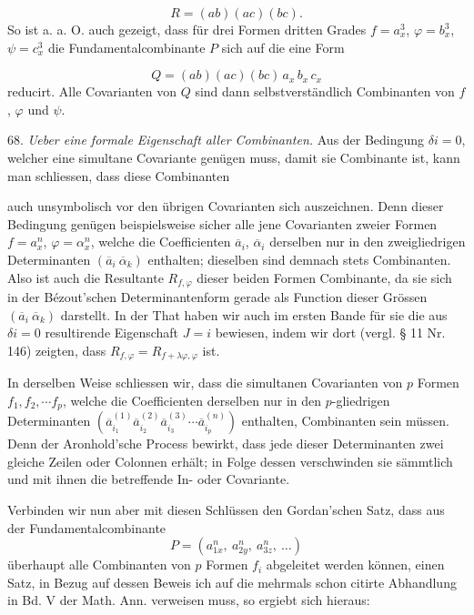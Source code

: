 \[
R = (ab)(ac)(bc) .
\]
So ist a. a. O. auch gezeigt, dass für drei Formen dritten Grades $f = a_x^3$, $\varphi = b_x^3$, $\psi = c_x^3$ die Fundamentalcombinante $P$ sich auf die eine Form

\[
Q = (ab)(ac)(bc)\, a_x\, b_x\, c_x
\]
reducirt. Alle Covarianten von $Q$ sind dann selbstverständlich Combinanten von $f$, $\varphi$ und $\psi$.

68. \textit{Ueber eine formale Eigenschaft aller Combinanten.} Aus der Bedingung $\delta i = 0$, welcher eine simultane Covariante genügen muss, damit sie Combinante ist, kann man schliessen, dass diese Combinanten


auch unsymbolisch vor den übrigen Covarianten sich auszeichnen. Denn dieser Bedingung genügen beispielsweise sicher alle jene Covarianten zweier Formen $f=a_x^n$, $\varphi=\alpha_x^n$, welche die Coefficienten $\overline a_i$, $\overline\alpha_i$ derselben nur in den zweigliedrigen Determinanten $(\overline a_i\ \overline\alpha_k)$ enthalten; dieselben sind demnach stets Combinanten. Also ist auch die Resultante $R_{f,\varphi}$ dieser beiden Formen Combinante, da sie sich in der Bézout'schen Determinantenform gerade als Function dieser Grössen $(\overline a_i\ \overline\alpha_k)$ darstellt. In der That haben wir auch im ersten Bande für sie die aus $\delta i=0$ resultirende Eigenschaft $J=i$ bewiesen, indem wir dort (vergl. § 11 Nr. 146) zeigten, dass $R_{f,\varphi}=R_{f+\lambda\varphi,\varphi}$ ist.

In derselben Weise schliessen wir, dass die simultanen Covarianten von $p$ Formen $f_1, f_2, \cdots f_p$, welche die Coefficienten derselben nur in den $p$-gliedrigen Determinanten $(\overline a_{i_1}^{(1)}\overline a_{i_2}^{(2)}\overline a_{i_3}^{(3)}\cdots\overline a_{i_p}^{(n)})$ enthalten, %
Combinanten sein müssen. Denn der Aronhold'sche Process bewirkt, dass jede dieser Determinanten zwei gleiche Zeilen oder Colonnen erhält; in Folge dessen verschwinden sie sämmtlich und mit ihnen die betreffende In- oder Covariante.

Verbinden wir nun aber mit diesen Schlüssen den Gordan'schen Satz, dass aus der Fundamentalcombinante
\[
P = (a_{1x}^n,\ a_{2y}^n,\ a_{3z}^n,\ \dots)
\]
überhaupt alle Combinanten von $p$ Formen $f_i$ abgeleitet werden können, einen Satz, in Bezug auf dessen Beweis ich auf die mehrmals schon citirte Abhandlung in Bd. V der Math. Ann. verweisen muss, so ergiebt sich hieraus:

